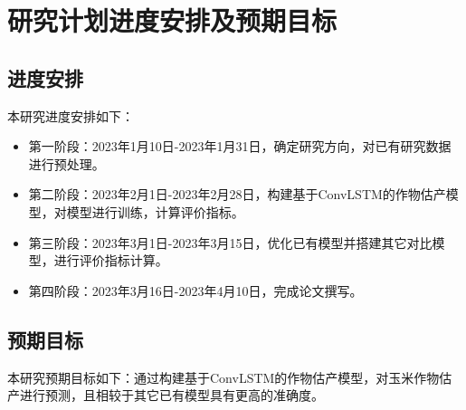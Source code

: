 \section{研究计划进度安排及预期目标}

\subsection{进度安排}
\par 本研究进度安排如下：
\begin{itemize}
  \item 第一阶段：2023年1月10日-2023年1月31日，确定研究方向，对已有研究数据进行预处理。
  \item 第二阶段：2023年2月1日-2023年2月28日，构建基于ConvLSTM的作物估产模型，对模型进行训练，计算评价指标。
  \item 第三阶段：2023年3月1日-2023年3月15日，优化已有模型并搭建其它对比模型，进行评价指标计算。
  \item 第四阶段：2023年3月16日-2023年4月10日，完成论文撰写。
\end{itemize}
\subsection{预期目标}
\par 本研究预期目标如下：通过构建基于ConvLSTM的作物估产模型，对玉米作物估产进行预测，且相较于其它已有模型具有更高的准确度。